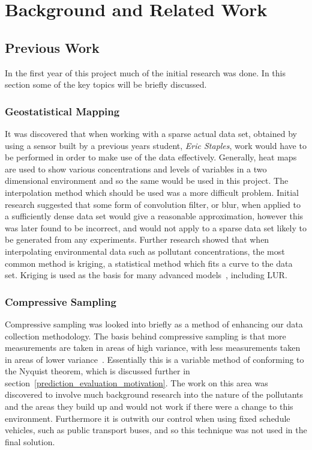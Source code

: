 \chapter{Background and Related Work}\label{background}


\section{Previous Work}\label{background_previous_work}


    In the first year of this project much of the initial research was done. In this section some of the key topics will be briefly discussed.

    

    \subsection{Geostatistical Mapping}
    
        It was discovered that when working with a sparse actual data set, obtained by using a sensor built by a previous years student, \emph{Eric Staples}, work would have to be performed in order to make use of the data effectively. Generally, heat maps are used to show various concentrations and levels of variables in a two dimensional environment and so the same would be used in this project. The interpolation method which should be used was a more difficult problem. Initial research suggested that some form of convolution filter, or blur, when applied to a sufficiently dense data set would give a reasonable approximation, however this was later found to be incorrect, and would not apply to a sparse data set likely to be generated from any experiments. Further research showed that when interpolating environmental data such as pollutant concentrations, the most common method is kriging, a statistical method which fits a curve to the data set. Kriging is used as the basis for many advanced models~\cite{regressionkriging}, including LUR.

    \subsection{Compressive Sampling}

        Compressive sampling was looked into briefly as a method of enhancing our data collection methodology. The basis behind compressive sampling is that more measurements are taken in areas of high variance, with less measurements taken in areas of lower variance~\cite{compressivesampling}. Essentially this is a variable method of conforming to the Nyquist theorem, which is discussed further in section~\ref{prediction_evaluation_motivation}. The work on this area was discovered to involve much background research into the nature of the pollutants and the areas they build up and would not work if there were a change to this environment. Furthermore it is outwith our control when using fixed schedule vehicles, such as public transport buses, and so this technique was not used in the final solution.

